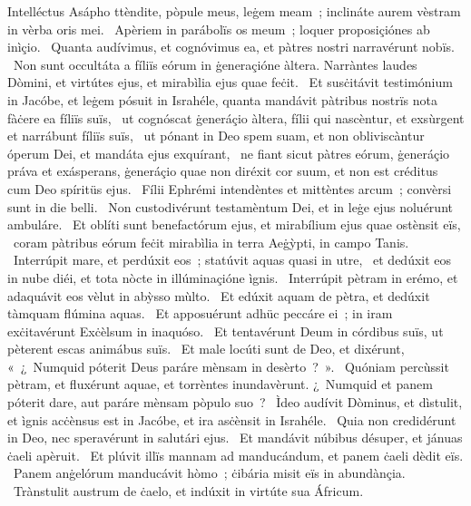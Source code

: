 { Intelléctus Asápho}
{%
ttèndite, pòpule meus, leġem meam~; inclináte aurem vèstram in vèrba oris mei. 
~Apèriem in parábolïs os meum~; loquer proposiçiónes ab inìçio. 
~Quanta audívimus, et cognóvimus ea, et pàtres nostri narravérunt nobïs. 
~Non sunt occultáta a fíliïs eórum in ġeneraçióne àltera. Narràntes laudes Dòmini, et virtútes ejus, et mirabìlia ejus quae feċit. 
~Et susċitávit testimónium in Jacóbe, et leġem pósuit in Israhéle, quanta mandávit pàtribus nostrïs nota fàċere ea fíliïs suïs, 
~ut cognóscat ġeneráçio àltera, fílii qui nascèntur, et exsùrgent et narrábunt fíliïs suïs, 
~ut pónant in Deo spem suam, et non obliviscàntur óperum Dei, et mandáta ejus exquírant, 
~ne fiant sicut pàtres eórum, ġeneráçio práva et exásperans, ġeneráçio quae non diréxit cor suum, et non est créditus cum Deo spíritüs ejus. 
~Fílii Ephrémi intendèntes et mittèntes arcum~; convèrsi sunt in die belli. 
~Non custodivérunt testamèntum Dei, et in leġe ejus noluérunt ambuláre. 
~Et oblíti sunt benefactórum ejus, et mirabílium ejus quae ostènsit eïs, 
~coram pàtribus eórum feċit mirabìlia in terra Aeġỳpti, in campo Tanis. 
~Interrúpit mare, et perdúxit eos~; statúvit aquas quasi in utre, 
~et dedúxit eos in nube diéi, et tota nòcte in illúminaçióne ìgnis. 
~Interrúpit pètram in erémo, et adaquávit eos vèlut in abỳsso mùlto. 
~Et edúxit aquam de pètra, et dedúxit tàmquam flúmina aquas. 
~Et apposuérunt adhüc peccáre ei~; in iram exċitavérunt Exċèlsum in inaquóso. 
~Et tentavérunt Deum in córdibus suïs, ut pèterent escas animábus suïs. 
~Et male locúti sunt de Deo, et dixérunt, «~¿~Numquid póterit Deus paráre mènsam in desèrto~?~». 
~Quóniam percùssit pètram, et fluxérunt aquae, et torrèntes inundavèrunt. ¿~Numquid et panem póterit dare, aut paráre mènsam pòpulo suo~? 
~Ìdeo audívit Dòminus, et dìstulit, et ìgnis acċènsus est in Jacóbe, et ira asċènsit in Israhéle. 
~Quia non credidérunt in Deo, nec speravérunt in salutári ejus. 
~Et mandávit núbibus désuper, et jánuas ċaeli apèruit. 
~Et plúvit illïs mannam ad manducándum, et panem ċaeli dèdit eïs. 
~Panem anġelórum manducávit hòmo~; ċibária misit eïs in abundànçia. 
~Trànstulit austrum de ċaelo, et indúxit in virtúte sua Áfricum. 
}
